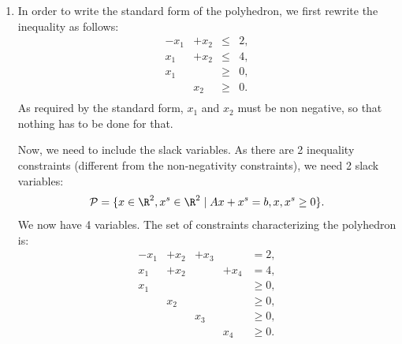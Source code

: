 \begin{enumerate}
\begin{center}
\end{center}
\item In order to write the standard form of the polyhedron, we first rewrite the inequality as follows:
    \[
  \begin{array}{rrcl}
    - x_1 & + x_2 &\leq& 2, \\
     x_1 & + x_2 &\leq& 4, \\
     x_1 &    &\geq& 0, \\
           &  x_2 &\geq& 0. \\
  \end{array}
  \]
  As required by the standard form, $x_1$ and $x_2$ must be non negative, so that nothing has to be done for that.
  
   Now, we need to include the slack variables. As there are 2 inequality
      constraints (different from the non-negativity constraints), we need 2 slack variables:
    \begin{equation}
    \mathcal{P} = \{x \in \R^2, x^s \in \R^2 \mid Ax + x^s = b, x, x^s \geq 0\}.
    \end{equation}
We now have 4 variables. The set of constraints characterizing the
polyhedron is:
\[
    \begin{array}{rrrrr}
        -x_1  & + x_2 & +x_3 &      &       = 2, \\
         x_1 &  + x_2 &      & +x_4    & = 4, \\
         x_1  &       &      &     &      \geq 0, \\               
              & x_2   &      &     &      \geq 0, \\               
              &       & x_3  &     &      \geq 0, \\               
              &       &      & x_4 &      \geq 0. \\               
    \end{array}
    \]
\end{enumerate}
